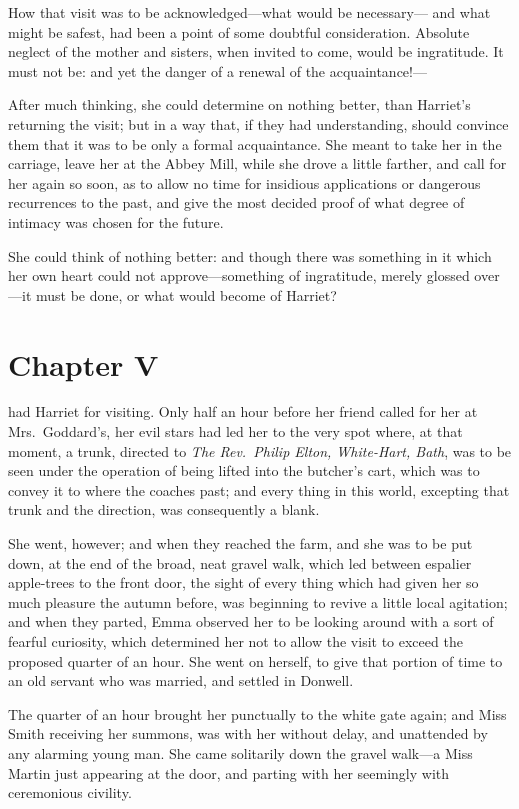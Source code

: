 How that visit was to be acknowledged---what would be necessary---%
and what might be safest, had been a point of some doubtful
consideration.  Absolute neglect of the mother and sisters,
when invited to come, would be ingratitude.  It must not be:
and yet the danger of a renewal of the acquaintance!---%

After much thinking, she could determine on nothing better, than Harriet's
returning the visit; but in a way that, if they had understanding,
should convince them that it was to be only a formal acquaintance.
She meant to take her in the carriage, leave her at the Abbey Mill,
while she drove a little farther, and call for her again so soon,
as to allow no time for insidious applications or dangerous
recurrences to the past, and give the most decided proof of what
degree of intimacy was chosen for the future.

She could think of nothing better:  and though there was something
in it which her own heart could not approve---something of ingratitude,
merely glossed over---it must be done, or what would become of Harriet?



\chapter{Chapter V}


 had Harriet for visiting.  Only half an hour before her
friend called for her at Mrs.\ Goddard's, her evil stars had led
her to the very spot where, at that moment, a trunk, directed to
\emph{The Rev.\ Philip Elton, White-Hart, Bath}, was to be seen under the
operation of being lifted into the butcher's cart, which was to
convey it to where the coaches past; and every thing in this world,
excepting that trunk and the direction, was consequently a blank.

She went, however; and when they reached the farm, and she was to
be put down, at the end of the broad, neat gravel walk, which led
between espalier apple-trees to the front door, the sight of every
thing which had given her so much pleasure the autumn before,
was beginning to revive a little local agitation; and when they parted,
Emma observed her to be looking around with a sort of fearful curiosity,
which determined her not to allow the visit to exceed the proposed
quarter of an hour.  She went on herself, to give that portion
of time to an old servant who was married, and settled in Donwell.

The quarter of an hour brought her punctually to the white gate again;
and Miss Smith receiving her summons, was with her without delay,
and unattended by any alarming young man.  She came solitarily
down the gravel walk---a Miss Martin just appearing at the door,
and parting with her seemingly with ceremonious civility.


